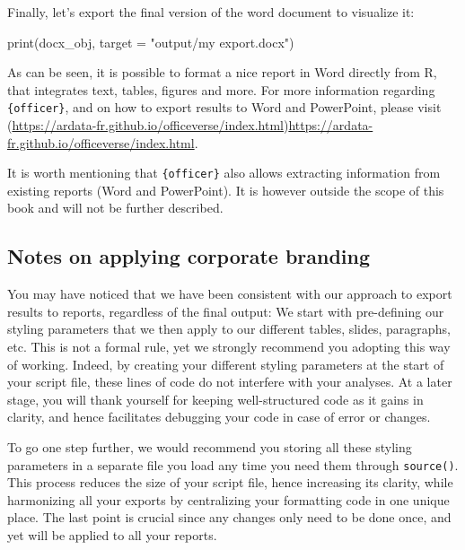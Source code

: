 \documentclass[
]{krantz}
\makeatletter
\newenvironment{Shaded}{\begin{snugshade}}{\end{snugshade}}
\newcommand{\AttributeTok}[1]{\textcolor[rgb]{0.61,0.61,0.61}{#1}}
\newcommand{\FunctionTok}[1]{\textcolor[rgb]{0,0,0}{#1}}
\newcommand{\NormalTok}[1]{#1}
\newcommand{\StringTok}[1]{\textcolor[rgb]{0.5,0.5,0.5}{#1}}
\renewenvironment{quote}{\begin{VF}}{\end{VF}}
\newenvironment{kframe}{%
\medskip{}
\setlength{\fboxsep}{.8em}
 \def\at@end@of@kframe{}%
 \ifinner\ifhmode%
  \def\at@end@of@kframe{\end{minipage}}%
  \begin{minipage}{\columnwidth}%
 \fi\fi%
 \def\FrameCommand##1{\hskip\@totalleftmargin \hskip-\fboxsep
 \colorbox{shadecolor}{##1}\hskip-\fboxsep
     \hskip-\linewidth \hskip-\@totalleftmargin \hskip\columnwidth}%
 \MakeFramed {\advance\hsize-\width
   \@totalleftmargin\z@ \linewidth\hsize
   \@setminipage}}%
 {\par\unskip\endMakeFramed%
 \at@end@of@kframe}
\renewenvironment{Shaded}{\begin{kframe}}{\end{kframe}}
\makeatother
\begin{document}
Finally, let's export the final version of the word document to visualize it:

\begin{Shaded}
\begin{Highlighting}[]
\FunctionTok{print}\NormalTok{(docx\_obj, }\AttributeTok{target =} \StringTok{"output/my export.docx"}\NormalTok{)}
\end{Highlighting}
\end{Shaded}

As can be seen, it is possible to format a nice report in Word directly from R, that integrates text, tables, figures and more. For more information regarding \texttt{\{officer\}}, and on how to export results to Word and PowerPoint, please visit (\url{https://ardata-fr.github.io/officeverse/index.html})\url{https://ardata-fr.github.io/officeverse/index.html}.

\begin{quote}
It is worth mentioning that \texttt{\{officer\}} also allows extracting information from existing reports (Word and PowerPoint). It is however outside the scope of this book and will not be further described.
\end{quote}

\hypertarget{notes-on-applying-corporate-branding}{%
\subsection{Notes on applying corporate branding}\label{notes-on-applying-corporate-branding}}

You may have noticed that we have been consistent with our approach to export results to reports, regardless of the final output:
We start with pre-defining our styling parameters that we then apply to our different tables, slides, paragraphs, etc. This is not a formal rule, yet we strongly recommend you adopting this way of working. Indeed, by creating your different styling parameters at the start of your script file, these lines of code do not interfere with your analyses. At a later stage, you will thank yourself for keeping well-structured code as it gains in clarity, and hence facilitates debugging your code in case of error or changes.

To go one step further, we would recommend you storing all these styling parameters in a separate file you load any time you need them through \texttt{source()}. This process reduces the size of your script file, hence increasing its clarity, while harmonizing all your exports by centralizing your formatting code in one unique place. The last point is crucial since any changes only need to be done once, and yet will be applied to all your reports.
\end{document}
